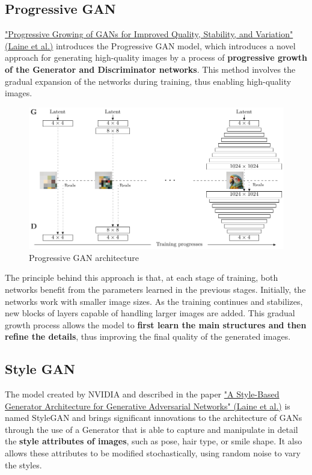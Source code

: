 \subsection{Progressive GAN}

\href{https://arxiv.org/pdf/1710.10196}{"Progressive Growing of GANs for Improved Quality, Stability, and Variation" (Laine et al.)} introduces the Progressive GAN model, which introduces a novel approach for generating high-quality images by a process of \textbf{progressive growth of the Generator and Discriminator networks}. This method involves the gradual expansion of the networks during training, thus enabling high-quality images.

\begin{figure}[!htbp]
    \centering
    \includegraphics[width=0.9\linewidth]{tikz/chapter9 - Progressive GAN.pdf}
    \caption{Progressive GAN architecture}
\end{figure}

The principle behind this approach is that, at each stage of training, both networks benefit from the parameters learned in the previous stages. Initially, the networks work with smaller image sizes. As the training continues and stabilizes, new blocks of layers capable of handling larger images are added. This gradual growth process allows the model to \textbf{first learn the main structures and then refine the details}, thus improving the final quality of the generated images.


\subsection{Style GAN}

The model created by NVIDIA and described in the paper \href{https://arxiv.org/pdf/1812.04948}{"A Style-Based Generator Architecture for Generative Adversarial Networks" (Laine et al.)} is named StyleGAN and brings significant innovations to the architecture of GANs through the use of a Generator that is able to capture and manipulate in detail the \textbf{style attributes of images}, such as pose, hair type, or smile shape. It also allows these attributes to be modified stochastically, using random noise to vary the styles.

